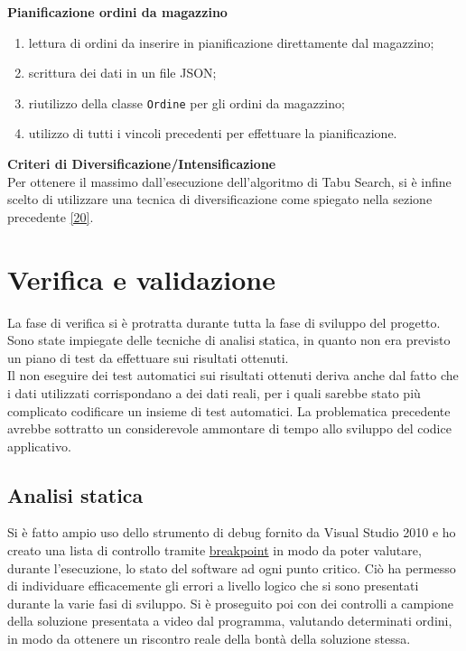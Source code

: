 \textbf{Pianificazione ordini da magazzino} 
\begin{enumerate}
        \item lettura di ordini da inserire in pianificazione direttamente dal magazzino;
        \item scrittura dei dati in un file JSON;
        \item riutilizzo della classe \texttt{Ordine} per gli ordini da magazzino;
        \item utilizzo di tutti i vincoli precedenti per effettuare la pianificazione.\\
\end{enumerate}

\textbf{Criteri di Diversificazione/Intensificazione}\\ 

Per ottenere il massimo dall'esecuzione dell'algoritmo di Tabu Search, si è infine scelto di utilizzare una tecnica di diversificazione come spiegato nella sezione precedente \hyperref[criteria]{[20]}.

\newpage

\section{Verifica e validazione}

La fase di verifica si è protratta durante tutta la fase di sviluppo del progetto. Sono state impiegate delle tecniche di analisi statica, in quanto non era previsto un piano di test
da effettuare sui risultati ottenuti.\\ Il non eseguire dei test automatici sui risultati ottenuti deriva anche dal fatto che i dati utilizzati corrispondano
a dei dati reali, per i quali sarebbe stato più complicato codificare un insieme di test automatici. La problematica precedente avrebbe sottratto un considerevole ammontare di tempo allo sviluppo del
codice applicativo. 

\subsection{Analisi statica}

Si è fatto ampio uso dello strumento di debug fornito da Visual Studio 2010 e ho creato una lista di controllo tramite \hyperref[Breakpoint]{breakpoint\glo} in modo da poter
valutare, durante l'esecuzione, lo stato del software ad ogni punto critico. Ciò ha permesso di individuare efficacemente gli errori a livello logico che si sono presentati
durante la varie fasi di sviluppo. Si è proseguito poi con dei controlli a campione della soluzione presentata a video dal programma, 
valutando determinati ordini, in modo da ottenere un riscontro reale della bontà della soluzione stessa. 

